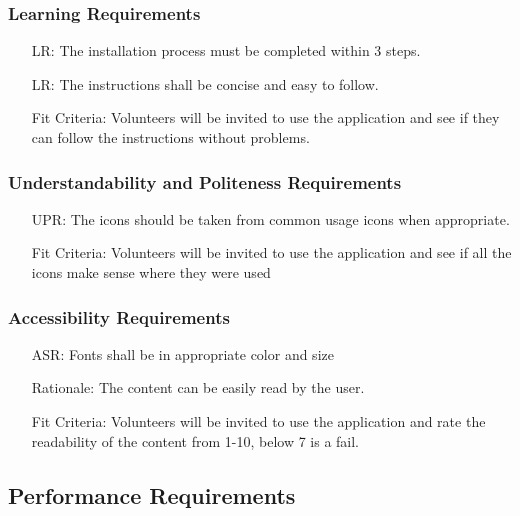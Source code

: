 \documentclass[12pt]{article}
\newcounter{reqnum} %
\newcounter{lrreqnum} %
\newcounter{uprreqnum} %
\newcounter{asrreqnum} %
\begin{document}
\subsubsection{Learning Requirements}
\begin{itemize}
    \item[LR\refstepcounter{lrreqnum}\thelrreqnum \label{R_Inputs}:] The installation process must be completed within 3 steps.
    \item[LR\refstepcounter{lrreqnum}\thelrreqnum \label{R_Inputs}:] The instructions shall be concise and easy to follow.
    \item[] Fit Criteria: Volunteers will be invited to use the application and see if they can follow the instructions without problems.
\end{itemize}

\subsubsection{Understandability and Politeness Requirements}
\begin{itemize}
    \item[UPR\refstepcounter{uprreqnum}\theuprreqnum \label{R_Inputs}:] The icons should be taken from common usage icons when appropriate.
    \item[] Fit Criteria: Volunteers will be invited to use the application and see if all the icons make sense where they were used
\end{itemize}

\subsubsection{Accessibility Requirements}
\begin{itemize}
    \item[ASR\refstepcounter{asrreqnum}\theasrreqnum \label{R_Inputs}:] Fonts shall be in appropriate color and size
    \item[] Rationale: The content can be easily read by the user.
    \item[] Fit Criteria: Volunteers will be invited to use the application and rate the readability of the content from 1-10, below 7 is a fail.
\end{itemize}


\subsection{Performance Requirements}
\end{document}
